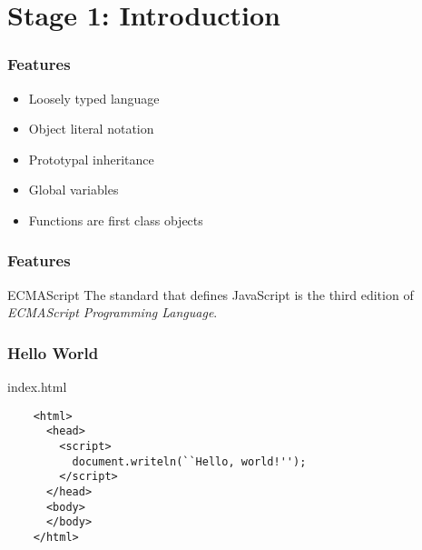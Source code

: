 \section{Stage 1: Introduction}

\begin{frame}
\end{frame}

\begin{frame}
  \frametitle{Features}

  \begin{itemize}
    \item Loosely typed language
    \pause\item Object literal notation
    \pause\item Prototypal inheritance
    \pause\item Global variables
    \pause\item Functions are first class objects
  \end{itemize}
\end{frame}

\begin{frame}
  \frametitle{Features}

  \begin{block}{ECMAScript}
    The standard that defines JavaScript is the third edition of \textit{ECMAScript Programming Language}.
  \end{block}
\end{frame}

\begin{frame}[fragile]
  \frametitle{Hello World}

  \begin{block}{index.html}
    {\scriptsize
    \begin{verbatim}
    <html>
      <head>
        <script>
          document.writeln(``Hello, world!'');
        </script>
      </head>
      <body>
      </body>
    </html>
    \end{verbatim}
    }
  \end{block}
\end{frame}

